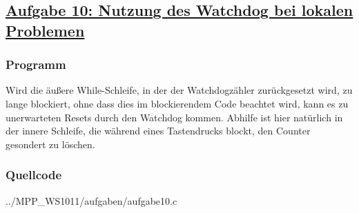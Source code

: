 \subsection
{\href{http://cst.mi.fu-berlin.de/intern/19606-P-MPP/Aufgaben/040302.html}
{Aufgabe 10: Nutzung des Watchdog bei lokalen Problemen}}

\subsubsection*{Programm}
Wird die äußere While-Schleife, in der der Watchdogzähler zurückgesetzt wird, zu lange
blockiert, ohne dass dies im blockierendem Code beachtet wird, kann es zu unerwarteten
Resets durch den Watchdog kommen. Abhilfe ist hier natürlich in der innere Schleife, die
während eines Tastendrucks blockt, den Counter gesondert zu löschen.


\subsubsection*{Quellcode}

{../MPP_WS1011/aufgaben/aufgabe10.c}

\begin{comment}
Wie können Sie registrieren und speichern, wann und an welcher Programmstelle der Watchdog das System neu gestartet hat.

Skizzieren Sie einen Lösungsansatz. Als Hilfestellung hier folgende Stichwörter:

    NMI-Interrupt
    Stackpointer
    Programcounter
    Softwarereset
    INFOMEM
\end{comment}
